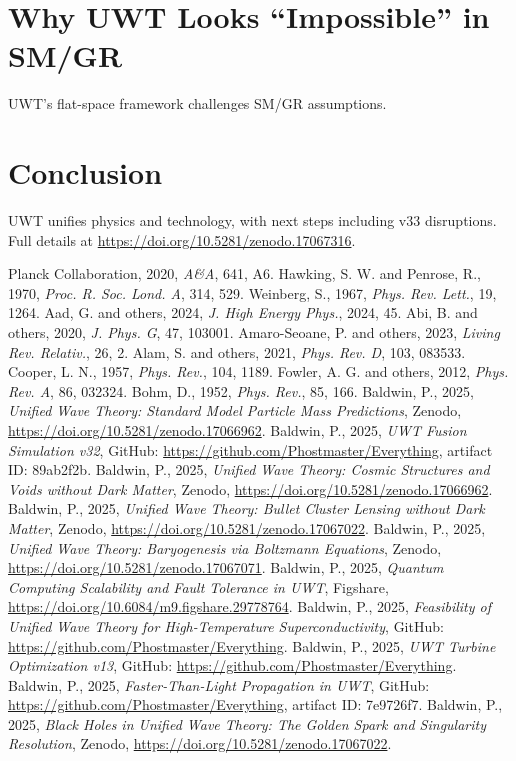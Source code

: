 \documentclass{article}
\begin{document}
\section{Why UWT Looks “Impossible” in SM/GR}
UWT’s flat-space framework challenges SM/GR assumptions.
\section{Conclusion}
UWT unifies physics and technology, with next steps including v33 disruptions. Full details at \url{https://doi.org/10.5281/zenodo.17067316}.
\begin{thebibliography}{9}
 Planck Collaboration, 2020, \textit{A\&A}, 641, A6.
 Hawking, S. W. and Penrose, R., 1970, \textit{Proc. R. Soc. Lond. A}, 314, 529.
 Weinberg, S., 1967, \textit{Phys. Rev. Lett.}, 19, 1264.
 Aad, G. and others, 2024, \textit{J. High Energy Phys.}, 2024, 45.
 Abi, B. and others, 2020, \textit{J. Phys. G}, 47, 103001.
 Amaro-Seoane, P. and others, 2023, \textit{Living Rev. Relativ.}, 26, 2.
 Alam, S. and others, 2021, \textit{Phys. Rev. D}, 103, 083533.
 Cooper, L. N., 1957, \textit{Phys. Rev.}, 104, 1189.
 Fowler, A. G. and others, 2012, \textit{Phys. Rev. A}, 86, 032324.
 Bohm, D., 1952, \textit{Phys. Rev.}, 85, 166.
 Baldwin, P., 2025, \textit{Unified Wave Theory: Standard Model Particle Mass Predictions}, Zenodo, \url{https://doi.org/10.5281/zenodo.17066962}.
 Baldwin, P., 2025, \textit{UWT Fusion Simulation v32}, GitHub: \url{https://github.com/Phostmaster/Everything}, artifact ID: 89ab2f2b.
 Baldwin, P., 2025, \textit{Unified Wave Theory: Cosmic Structures and Voids without Dark Matter}, Zenodo, \url{https://doi.org/10.5281/zenodo.17066962}.
 Baldwin, P., 2025, \textit{Unified Wave Theory: Bullet Cluster Lensing without Dark Matter}, Zenodo, \url{https://doi.org/10.5281/zenodo.17067022}.
 Baldwin, P., 2025, \textit{Unified Wave Theory: Baryogenesis via Boltzmann Equations}, Zenodo, \url{https://doi.org/10.5281/zenodo.17067071}.
 Baldwin, P., 2025, \textit{Quantum Computing Scalability and Fault Tolerance in UWT}, Figshare, \url{https://doi.org/10.6084/m9.figshare.29778764}.
 Baldwin, P., 2025, \textit{Feasibility of Unified Wave Theory for High-Temperature Superconductivity}, GitHub: \url{https://github.com/Phostmaster/Everything}.
 Baldwin, P., 2025, \textit{UWT Turbine Optimization v13}, GitHub: \url{https://github.com/Phostmaster/Everything}.
 Baldwin, P., 2025, \textit{Faster-Than-Light Propagation in UWT}, GitHub: \url{https://github.com/Phostmaster/Everything}, artifact ID: 7e9726f7.
 Baldwin, P., 2025, \textit{Black Holes in Unified Wave Theory: The Golden Spark and Singularity Resolution}, Zenodo, \url{https://doi.org/10.5281/zenodo.17067022}.
\end{thebibliography}
\end{document}
